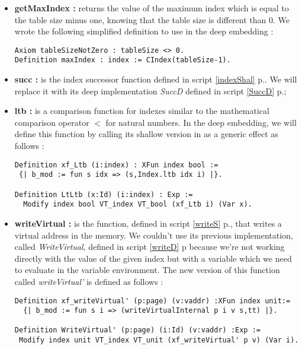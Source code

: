 \begin{itemize}
	\item\textbf{getMaxIndex :} returns the value of the maximum index which is equal to the table size minus one, knowing that the table size is different than 0. We wrote the following simplified definition to use in the deep embedding : 
\begin{lstlisting}[caption = {maxIndex definition}, xleftmargin=.01\textwidth,
xrightmargin=.01\textwidth,mathescape=true]
Axiom tableSizeNotZero : tableSize <> 0.
Definition maxIndex : index := CIndex(tableSize-1). 
\end{lstlisting} \vspace{4pt}
	\item \textbf{succ :} is the index successor function defined in script \ref{indexShal} p.\pageref{indexShal}. We will replace it with its deep implementation \textit{SuccD} defined in script \ref{SuccD} p.\pageref{SuccD};
	\item \textbf{ltb :} is a comparison function for indexes similar to the mathematical comparison operator $<$ for natural numbers. In the deep embedding, we will define this function by calling its shallow version in as a generic effect as follows :
\begin{lstlisting}[caption = {LtLtb definition}, xleftmargin=-.05\textwidth,
xrightmargin=-.01\textwidth,mathescape=true]
Definition xf_Ltb (i:index) : XFun index bool := 
 {| b_mod := fun s idx => (s,Index.ltb idx i) |}.

Definition LtLtb (x:Id) (i:index) : Exp :=
  Modify index bool VT_index VT_bool (xf_Ltb i) (Var x). 
\end{lstlisting} 	
	\item \textbf{writeVirtual :} is the function, defined in script \ref{writeS} p.\pageref{writeS}, that writes a virtual address in the memory. We couldn't use its previous implementation, called \textit{WriteVirtual}, defined in script \ref{writeD} p\pageref{writeD} because we're not working directly with the value of the given index but with a variable which we need to evaluate in the variable environment. The new version of this function called \textit{writeVirtual'} is defined as follows :
\begin{lstlisting}[caption = {writeVirtual new definition}, xleftmargin=-.15\textwidth,
xrightmargin=-.11\textwidth,mathescape=true]
Definition xf_writeVirtual' (p:page) (v:vaddr) :XFun index unit:= 
  {| b_mod := fun s i => (writeVirtualInternal p i v s,tt) |}.
 
Definition WriteVirtual' (p:page) (i:Id) (v:vaddr) :Exp :=
 Modify index unit VT_index VT_unit (xf_writeVirtual' p v) (Var i).
\end{lstlisting} 
\end{itemize}
